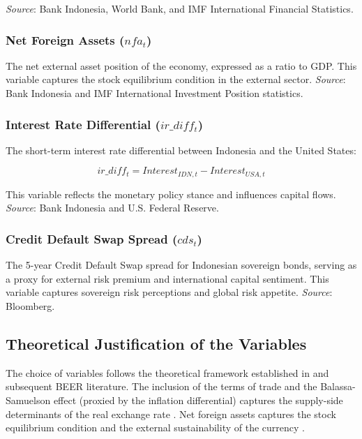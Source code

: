 \documentclass[11pt,a4paper]{article}
\begin{document}
\textit{Source}: Bank Indonesia, World Bank, and IMF International Financial Statistics.

\subsubsection{Net Foreign Assets ($nfa_t$)}

The net external asset position of the economy, expressed as a ratio to GDP. This variable captures the stock equilibrium condition in the external sector. \textit{Source}: Bank Indonesia and IMF International Investment Position statistics.

\subsubsection{Interest Rate Differential ($ir\_diff_t$)}

The short-term interest rate differential between Indonesia and the United States:

\begin{equation}
ir\_diff_t = Interest_{IDN,t} - Interest_{USA,t}
\label{eq:interest_differential}
\end{equation}

This variable reflects the monetary policy stance and influences capital flows. \textit{Source}: Bank Indonesia and U.S. Federal Reserve.

\subsubsection{Credit Default Swap Spread ($cds_t$)}

The 5-year Credit Default Swap spread for Indonesian sovereign bonds, serving as a proxy for external risk premium and international capital sentiment. This variable captures sovereign risk perceptions and global risk appetite. \textit{Source}: Bloomberg.

\subsection{Theoretical Justification of the Variables}

The choice of variables follows the theoretical framework established in \cite{ClarkMacDonald1998} and subsequent BEER literature. The inclusion of the terms of trade and the Balassa-Samuelson effect (proxied by the inflation differential) captures the supply-side determinants of the real exchange rate \citep{ClarkMacDonald1998}. Net foreign assets captures the stock equilibrium condition and the external sustainability of the currency \citep{ClarkMacDonald1998, Faruque1995}.
\end{document}
